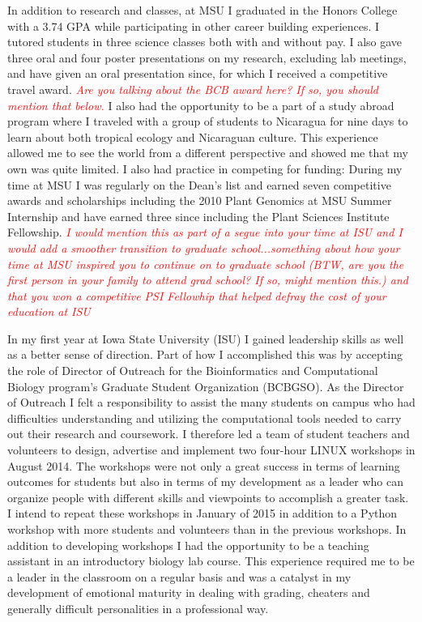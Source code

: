 \documentclass[12pt]{amsart}
\newcommand{\mbh}[1]{\textcolor{red}{ \emph{\scriptsize  #1}} }
\begin{document}
In addition to research and classes, at MSU I graduated in the Honors College with a 3.74 GPA while participating in other career building experiences.  
I tutored students in three science classes both with and without pay.
I also gave three oral and four poster presentations on my research, excluding lab meetings, and have given an oral presentation since, for which I received a competitive travel award. \mbh{Are you talking about the BCB award here?  If so, you should mention that below.}
I also had the opportunity to be a part of a study abroad program where I traveled with a group of students to Nicaragua for nine days to learn about both tropical ecology and Nicaraguan culture. 
This experience allowed me to see the world from a different perspective and showed me that my own was quite limited.
I also had practice in competing for funding:
During my time at MSU I was regularly on the Dean's list and earned seven competitive awards and scholarships including the 2010 Plant Genomics at MSU Summer Internship and have earned three since including the Plant Sciences Institute Fellowship. \mbh{I would mention this as part of a segue into your time at ISU and I would add a smoother transition to graduate school...something about how your time at MSU inspired you to continue on to graduate school (BTW, are you the first person in your family to attend grad school?  If so, might mention this.) and that you won a competitive PSI Fellowhip that helped defray the cost of your education at ISU}

In my first year at Iowa State University (ISU) I gained leadership skills as well as a better sense of direction.  
Part of how I accomplished this was by accepting the role of Director of Outreach for the Bioinformatics and Computational Biology program's Graduate Student Organization (BCBGSO).
As the Director of Outreach I felt a responsibility to assist the many students on campus who had difficulties understanding and utilizing the computational tools needed to carry out their research and coursework.
I therefore led a team of student teachers and volunteers to design, advertise and implement two four-hour LINUX workshops in August 2014.
The workshops were not only a great success in terms of learning outcomes for students but also in terms of my development as a leader who can organize people with different skills and viewpoints to accomplish a greater task.
I intend to repeat these workshops in January of 2015 in addition to a Python workshop with more students and volunteers than in the previous workshops.  
In addition to developing workshops I had the opportunity to be a teaching assistant in an introductory biology lab course.
This experience required me to be a leader in the classroom on a regular basis and was a catalyst in my development of emotional maturity in dealing with grading, cheaters and generally difficult personalities in a professional way.
\end{document}
